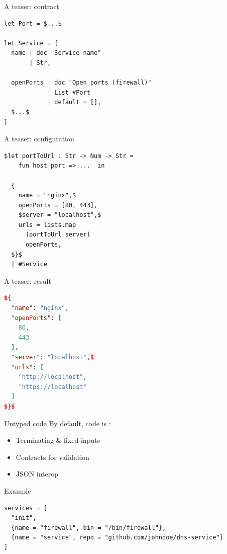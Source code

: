 \documentclass[aspectratio=169]{beamer}
\newcommand{\couleur}[2]{{\color{#1}{#2}}}
\begin{document}
\begin{frame}[fragile]{A teaser: contract}
\begin{lstlisting}[language=Nickel,title={contracts.ncl}]
let Port = $...$

let Service = {
  name | doc "Service name"
       | Str,

  openPorts | doc "Open ports (firewall)"
            | List #Port
            | default = [],
  $...$
}
\end{lstlisting}
\end{frame}

\begin{frame}[fragile]{A teaser: configuration}
\begin{lstlisting}[language=Nickel,title={nginx.ncl}]
  $let portToUrl : Str -> Num -> Str =
    fun host port => ...  in

  {
    name = "nginx",$
    openPorts = [80, 443],
    $server = "localhost",$
    urls = lists.map
      (portToUrl server)
      openPorts,
  $}$
  | #Service
\end{lstlisting}
\end{frame}

\begin{frame}[fragile]{A teaser: result}
\begin{lstlisting}[language=Json,title={nginx.json}]
${
  "name": "nginx",
  "openPorts": [
    80,
    443
  ],
  "server": "localhost",$
  "urls": [
    "http://localhost",
    "https://localhost"
  ]
$}$
\end{lstlisting}
\end{frame}

\begin{frame}[fragile]{Untyped code}
    By default, code is \couleur{pink-froly}{untyped}:
    \begin{itemize}
        \item Terminating \& fixed inputs
        \item Contracts for validation
        \item JSON interop
    \end{itemize}

    \begin{exampleblock}{Example}
\begin{lstlisting}[language=Nickel,title={Heterogeneous values}]
services = [
  "init",
  {name = "firewall", bin = "/bin/firewall"},
  {name = "service", repo = "github.com/johndoe/dns-service"}
]
\end{lstlisting}
    \end{exampleblock}
\end{frame}
\end{document}
